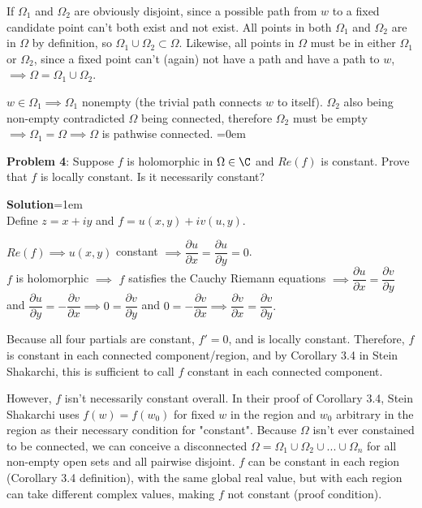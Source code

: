 \documentclass{article}
\begin{document}
If $\Omega_1$ and $\Omega_2$ are obviously disjoint, since a possible path from $w$ to a fixed candidate point can't both exist and not exist. All points in both $\Omega_1$ and $\Omega_2$ are in $\Omega$ by definition, so $\Omega_1 \cup \Omega_2 \subset \Omega$. Likewise, all points in $\Omega$ must be in either $\Omega_1$ or $\Omega_2$, since a fixed point can't (again) not have a path and have a path to $w$, $\implies \Omega = \Omega_1 \cup \Omega_2$. 

$w \in \Omega_1 \implies \Omega_1$ nonempty (the trivial path connects $w$ to itself). $\Omega_2$ also being non-empty contradicted $\Omega$ being connected, therefore $\Omega_2$ must be empty $\implies \Omega_1 = \Omega \implies \Omega$ is pathwise connected.
\newpage\parskip=0em
\begin{mdframed}[backgroundcolor=blue!20]
\textbf{Problem 4}: Suppose $f$ is holomorphic in $\Omega \in \C$ and $Re(f)$ is constant. Prove that $f$ is locally constant. Is it necessarily constant?
\end{mdframed}
\textbf{Solution}\parskip=1em\\
Define $z = x + iy$ and $f = u(x, y) + iv(u, y)$. 

$Re(f) \implies u(x, y)$ constant $\implies \dfrac{\partial u}{\partial x} = \dfrac{\partial u}{\partial y} = 0$.\\ 
$f$ is holomorphic $\implies$ $f$ satisfies the Cauchy Riemann equations $\implies \dfrac{\partial u}{\partial x} = \dfrac{\partial v}{\partial y}$ and $\dfrac{\partial u}{\partial y} = -\dfrac{\partial v}{\partial x} \implies 0 = \dfrac{\partial v}{\partial y}$ and $0 = -\dfrac{\partial v}{\partial x} \implies \dfrac{\partial v}{\partial x} = \dfrac{\partial v}{\partial y}.$

Because all four partials are constant, $f' = 0$, and is locally constant. Therefore, $f$ is constant in each connected component/region, and by Corollary 3.4 in Stein Shakarchi, this is sufficient to call $f$ constant in each connected component. 

However, $f$ isn't necessarily constant overall. In their proof of Corollary 3.4, Stein Shakarchi uses $f(w) = f(w_0)$ for fixed $w$ in the region and $w_0$ arbitrary in the region as their necessary condition for "constant". Because $\Omega$ isn't ever constained to be connected, we can conceive a disconnected $\Omega = \Omega_1 \cup \Omega_2 \cup...\cup \Omega_n$ for all non-empty open sets and all pairwise disjoint. $f$ can be constant in each  region (Corollary 3.4 definition), with the same global real value, but with each region can take different complex values, making $f$ not constant (proof condition). 
\end{document}
